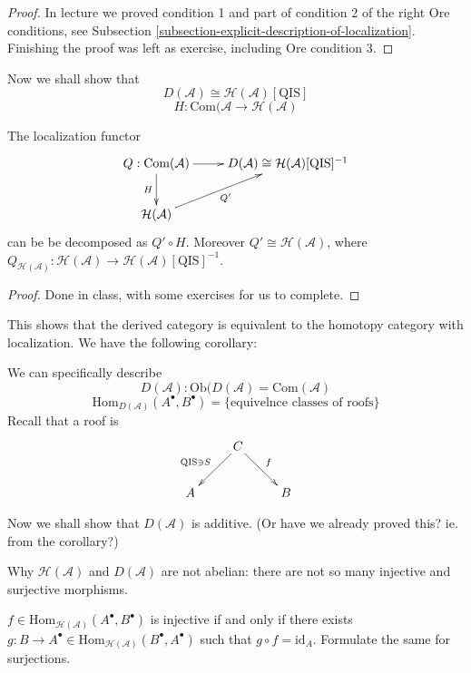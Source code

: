 \begin{proof}
In lecture we proved condition 1 and part of condition 2 of the right Ore
conditions, see Subsection
\ref{subsection-explicit-description-of-localization}. Finishing the proof was
left as exercise, including Ore condition 3.
\end{proof}

\bigskip\noindent
Now we shall show that
$$
D(\mathcal{A})\cong \mathcal{H}(\mathcal{A})[\text{QIS}]
$$
$$
H:\text{Com}(\mathcal{A}\to \mathcal{H}(\mathcal{A})
$$
\begin{proposition}
\label{proposition-localization-functor}
The localization functor
$$
\xymatrix{
Q:\text{Com}(\mathcal{A})\ar[d]_H\ar[r]
& D(\mathcal{A})\cong\mathcal{H}(\mathcal{A})[\text{QIS}]^{-1}\\
\mathcal{H}(\mathcal{A})\ar[ur]_{Q'}
}
$$
can be be decomposed as $Q' \circ H$. Moreover $Q' \cong
\mathcal{H}(\mathcal{A})$, where
$Q_{\mathcal{H}(\mathcal{A})}:\mathcal{H}(\mathcal{A}) \to
\mathcal{H}(\mathcal{A})[\text{QIS}]^{-1}$.
\end{proposition}

\begin{proof}
Done in class, with some exercises for us to complete.
\end{proof}

This shows that the derived category is equivalent to the homotopy category with
localization. We have the following corollary:

\begin{lemma}
\label{lemma-}
We can specifically describe
$$
D(\mathcal{A}): \text{Ob}(D(\mathcal{A}) = \text{Com}(\mathcal{A})
$$
$$
\text{Hom}_{D(\mathcal{A})}(A^{\bullet},B^{\bullet})
=\{\text{equivelnce classes of roofs}\}
$$
Recall that a roof is
$$
\xymatrix{
& C\ar[dl]_{\text{QIS}\ni S}\ar[dr]^{f}\\
A& & B
}
$$
\end{lemma}

\bigskip\noindent
Now we shall show that $D(\mathcal{A})$ is additive. (Or have we already proved
this? ie. from the corollary?)

\bigskip\noindent
Why $\mathcal{H}(\mathcal{A})$ and $D(\mathcal{A})$ are not abelian: there are
not so many injective and surjective morphisms.

\begin{exercise}
\label{exercise-no-injective-surjective-morphisms-in-derived-categories}
$f \in \text{Hom}_{\mathcal{H}(\mathcal{A})} (A^{\bullet},B^{\bullet})$ is
injective if and only if there exists  $g: B \to A^{\bullet} \in
\text{Hom}_{\mathcal{H}(\mathcal{A})} (B^{\bullet},A^{\bullet})$ such that $g
\circ f=\text{id}_A$. Formulate the same for surjections.
\end{exercise}

